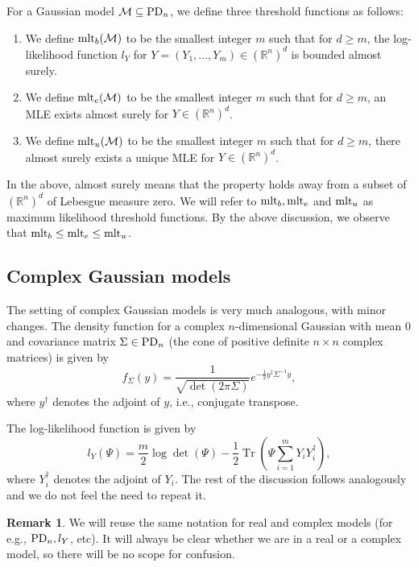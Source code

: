 \documentclass[11pt]{amsart}
\theoremstyle{definition}
\newtheorem{remark}[theorem]{Remark}
\newcommand{\R}{{\mathbb R}}
\newcommand{\PD} {{\rm PD}}
\newcommand{\mlt}{{\rm mlt}}
\newcommand{\tnr}{\operatorname{Tr}}
\begin{document}
For a Gaussian model $\mathcal{M} \subseteq \PD_n$, we define three threshold functions as follows:
\begin{enumerate} 
\item We define $\mlt_b(\mathcal{M})$ to be the smallest integer $m$ such that for $d \geq m$, the log-likelihood function $l_Y$ for $Y = (Y_1,\dots,Y_m) \in (\R^n)^d$ is bounded almost surely.
\item We define $\mlt_e(\mathcal{M})$ to be the smallest integer $m$ such that for $d \geq m$, an MLE exists almost surely for $Y \in (\R^n)^d$.
\item We define $\mlt_u(\mathcal{M})$ to be the smallest integer $m$ such that for $d \geq m$, there almost surely exists a unique MLE for $Y \in (\R^n)^d$.
\end{enumerate}

In the above, almost surely means that the property holds away from a subset of $(\R^n)^d$ of Lebesgue measure zero. We will refer to $\mlt_b,\mlt_e$ and $\mlt_u$ as maximum likelihood threshold functions. By the above discussion, we observe that $\mlt_b \leq \mlt_e \leq \mlt_u$.

\subsection{Complex Gaussian models}
The setting of complex Gaussian models is very much analogous, with minor changes. The density function for a complex $n$-dimensional Gaussian with mean $0$ and covariance matrix $\Sigma \in \PD_n$ (the cone of positive definite $n \times n$ complex matrices) is given by
$$
f_\Sigma(y) = \frac{1}{\sqrt{\det(2 \pi \Sigma)}} e^{- \frac{1}{2} y^\dag \Sigma^{-1} y},
$$
where $y^{\dag}$ denotes the adjoint of $y$, i.e., conjugate transpose.

The log-likelihood function is given by
$$
l_Y(\Psi) = \frac{m}{2} \log \det(\Psi) - \frac{1}{2}\tnr \left(\Psi \sum_{i=1}^m Y_iY_i^\dag \right),
$$
where $Y_i^\dag$ denotes the adjoint of $Y_i$. The rest of the discussion follows analogously and we do not feel the need to repeat it.

\begin{remark}
We will reuse the same notation for real and complex models (for e.g., $\PD_n, l_Y$, etc). It will always be clear whether we are in a real or a complex model, so there will be no scope for confusion.
\end{remark}
\end{document}
